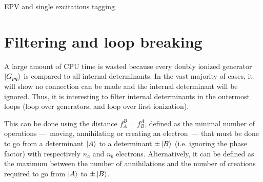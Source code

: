 \documentclass[./thesis.tex]{subfiles}
\begin{document}
\begin{algorithm}
        \caption{EPV and single excitations tagging}
        \label{alg:unblock_single}

                        
\end{algorithm}



\section{Filtering and loop breaking}

A large amount of CPU time is wasted because every doubly ionized generator $\ket {G_{pq}}$ is compared to all internal determinants. In the vast majority of cases, it will show no connection can be made and the internal determinant will be ignored. Thus, it is interesting to filter internal determinants in the outermost loops (loop over generators, and loop over first ionization).

This can be done using the distance $f_A^B = f_B^A$, defined as the minimal number of operations ---~moving, annihilating or creating an electron~--- that must be done to go from a determinant $\ket A$ to a determinant $\pm \ket B$ (i.e. ignoring the phase factor) with respectively $n_a$ and $n_b$ electrons.
Alternatively, it can be defined as the maximum between the number of annihilations and the number of creations required to go from $\ket A$ to $\pm \ket B$.
\end{document}
